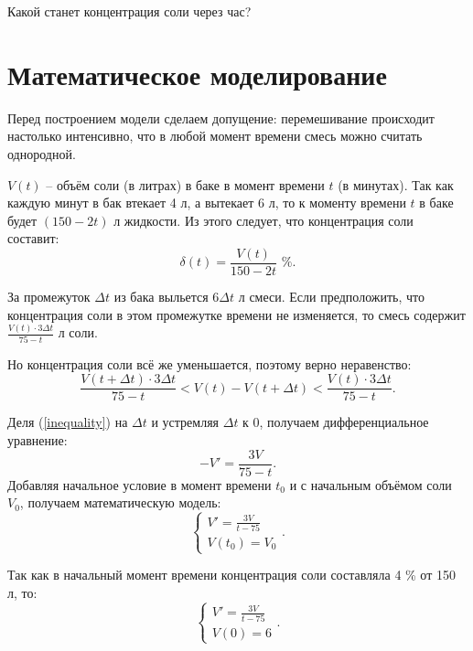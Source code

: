 \documentclass[a4paper,14pt]{extarticle}
\begin{document}
    Какой станет концентрация соли через час?

    \section{Математическое моделирование}
    Перед построением модели сделаем допущение: перемешивание происходит настолько интенсивно, что в любой момент времени смесь можно считать однородной.

    $V(t)$ -- объём соли (в литрах) в баке в момент времени $t$ (в минутах).
    Так как каждую минут в бак втекает 4 л, а вытекает 6 л, то к моменту времени $t$ в баке будет $(150 -2t)$ л жидкости.
    Из этого следует, что концентрация соли составит: 
    \begin{equation}
        \displaystyle \delta(t) = \frac{V(t)}{150 - 2t} \text{ \%}.
    \end{equation}

    За промежуток $\Delta t$ из бака выльется $6 \Delta t$ л смеси.
    Если предположить, что концентрация соли в этом промежутке времени не изменяется, то смесь содержит $\displaystyle \frac{V(t) \cdot 3\Delta t}{75 - t}$ л соли.

    Но  концентрация соли всё же уменьшается, поэтому верно неравенство:
    \begin{equation} \label{inequality}
        \displaystyle \frac{V(t + \Delta t) \cdot 3\Delta t}{75 - t} < V(t) - V(t + \Delta t) < \frac{V(t) \cdot 3\Delta t}{75 - t}.
    \end{equation}

    Деля (\ref{inequality}) на $\Delta t$ и устремляя $\Delta t$ к 0, получаем дифференциальное уравнение:
    \begin{equation*}
        \displaystyle -V' = \frac{3V}{75 - t}.
    \end{equation*}
    Добавляя начальное условие в момент времени $t_0$ и с начальным объёмом соли $V_0$, получаем математическую модель:
    \begin{equation*}
        \begin{cases}
            \displaystyle V' = \frac{3V}{t - 75} \\
            V(t_0) = V_0
        \end{cases}.
    \end{equation*}

    Так как в начальный момент времени концентрация соли составляла 4 \% от 150 л, то:
    \begin{equation} \label{model}
        \begin{cases}
            \displaystyle V' = \frac{3V}{t - 75} \\
            V(0) = 6
        \end{cases}.
    \end{equation}
\end{document}
